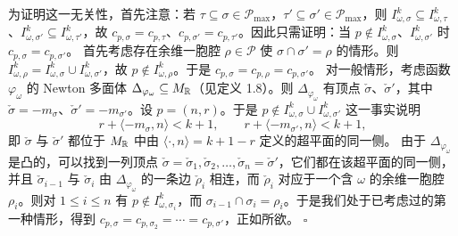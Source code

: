 
为证明这一无关性，首先注意：若 $\tau\subseteq\sigma\in\mathcal{P}_{\max}$，$\tau'\subseteq\sigma'\in\mathcal{P}_{\max}$，则 $I^k_{\omega,\sigma}\subseteq I^k_{\omega,\tau}$、$I^k_{\omega,\sigma'}\subseteq I^k_{\omega,\tau'}$，故 $c_{p,\sigma}=c_{p,\tau}$、$c_{p,\sigma'}=c_{p,\tau'}$。因此只需证明：当 $p\notin I^k_{\omega,\sigma}$、$I^k_{\omega,\sigma'}$ 时 $c_{p,\sigma}=c_{p,\sigma'}$。
首先考虑存在余维一胞腔 $\rho\in\mathcal{P}$ 使 $\sigma\cap\sigma'=\rho$ 的情形。则 $I^k_{\omega,\rho}=I^k_{\omega,\sigma}\cup I^k_{\omega,\sigma'}$，故 $p\notin I^k_{\omega,\rho}$。于是 $c_{p,\sigma}=c_{p,\rho}=c_{p,\sigma'}$。
对一般情形，考虑函数 $\varphi_\omega$ 的 Newton 多面体 $\Delta_{\varphi_\omega}\subseteq M_{\mathbb{R}}$（见定义 1.8）。则 $\Delta_{\varphi_\omega}$ 有顶点 $\check\sigma$、$\check\sigma'$，其中 $\check\sigma=-m_\sigma$、$\check\sigma'=-m_{\sigma'}$。设 $p=(n,r)$。于是 $p\notin I^k_{\omega,\sigma}\cup I^k_{\omega,\sigma'}$ 这一事实说明
\[
r+\langle-m_\sigma,n\rangle<k+1,\qquad r+\langle-m_{\sigma'},n\rangle<k+1,
\]
即 $\check\sigma$ 与 $\check\sigma'$ 都位于 $M_{\mathbb{R}}$ 中由 $\langle\cdot,n\rangle=k+1-r$ 定义的超平面的同一侧。
由于 $\Delta_{\varphi_\omega}$ 是凸的，可以找到一列顶点 $\check\sigma=\check\sigma_1,\check\sigma_2,\dots,\check\sigma_n=\check\sigma'$，它们都在该超平面的同一侧，并且 $\check\sigma_{i-1}$ 与 $\check\sigma_i$ 由 $\Delta_{\varphi_\omega}$ 的一条边 $\check\rho_i$ 相连，而 $\check\rho_i$ 对应于一个含 $\omega$ 的余维一胞腔 $\rho_i$。则对 $1\le i\le n$ 有 $p\notin I^k_{\omega,\sigma_i}$，而 $\sigma_{i-1}\cap\sigma_i=\rho_i$。于是我们处于已考虑过的第一种情形，得到 $c_{p,\sigma}=c_{p,\sigma_2}=\cdots=c_{p,\sigma'}$，正如所欲。
\hfill$\square$

